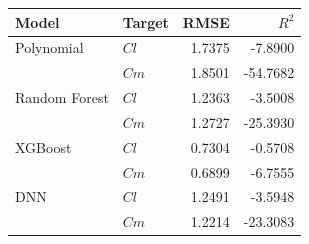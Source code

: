 \begin{tabular}{llrr}
\toprule
Model & Target & RMSE & $R^2$ \\ \midrule
Polynomial & $Cl$ & 1.7375 & -7.8900 \\
 & $Cm$ & 1.8501 & -54.7682 \\
Random Forest & $Cl$ & 1.2363 & -3.5008 \\
 & $Cm$ & 1.2727 & -25.3930 \\
XGBoost & $Cl$ & 0.7304 & -0.5708 \\
 & $Cm$ & 0.6899 & -6.7555 \\
DNN & $Cl$ & 1.2491 & -3.5948 \\
 & $Cm$ & 1.2214 & -23.3083 \\
\bottomrule
\end{tabular}